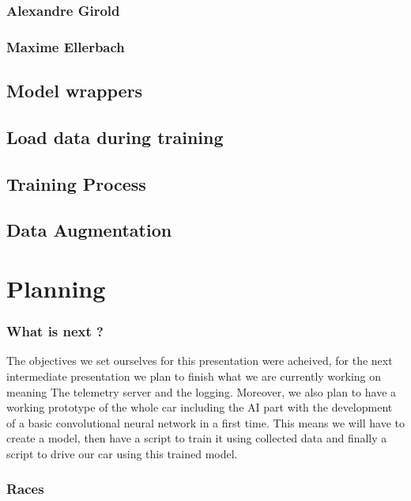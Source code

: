 \documentclass[12pt]{article}
\begin{document}
\subsubsection{Alexandre Girold}
\subsubsection{Maxime Ellerbach}


\subsection{Model wrappers}

\subsection{Load data during training}

\subsection{Training Process}

\subsection{Data Augmentation}



\newpage

\section {Planning}
\subsubsection {What is next ?}
The objectives we set ourselves for this presentation were acheived, for the next intermediate presentation we plan to finish what we are currently working on meaning The telemetry server and the logging. Moreover, we also plan to have a working prototype of the whole car including the AI part with the development of a basic convolutional neural network in a first time. This means we will have to create a model, then have a script to train it using collected data and finally a script to drive our car using this trained model.

\subsubsection {Races}
\end{document}
